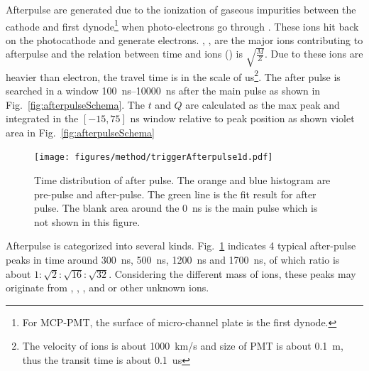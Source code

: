 Afterpulse are generated due to the ionization of gaseous impurities between the cathode and first dynode\footnote{For MCP-PMT, the surface of micro-channel plate is the first dynode.} when photo-electrons go through \cite{Coates_1973}. These ions hit back on the photocathode and generate electrons. , ,  are the major ions contributing to afterpulse and the relation between time and ions () is $\sqrt{\frac{M}{Z}}$\cite{Coates_1973}. Due to these ions are heavier than electron, the travel time is in the scale of \si{us}\footnote{The velocity of ions is about \SI{1000}{km/s} and size of PMT is about \SI{0.1}{m}, thus the transit time is about \SI{0.1}{us}}. The after pulse is searched in a window \SIrange{100}{10000}{ns} after the main pulse as shown in Fig.~\ref{fig:afterpulseSchema}. The $t$ and $Q$ are calculated as the max peak and integrated in the $[-15,75]$ ns window relative to peak position as shown violet area in Fig.~\ref{fig:afterpulseSchema}
\begin{figure}[!htbp]
    \centering
    \texttt{[image: figures/method/triggerAfterpulse1d.pdf]}
    \caption{Time distribution of after pulse. The orange and blue histogram are pre-pulse and after-pulse. The green line is the fit result for after pulse. The blank area around the \SI{0}{ns} is the main pulse which is not shown in this figure.}
    \label{fig:afterpulse1d}
\end{figure}

Afterpulse is categorized into several kinds. Fig.~\ref{fig:afterpulse1d} indicates 4 typical after-pulse peaks in time around \SI{300}{ns}, \SI{500}{ns}, \SI{1200}{ns} and \SI{1700}{ns}, of which ratio is about $1:\sqrt{2}:\sqrt{16}:\sqrt{32}$. Considering the different mass of ions, these peaks may originate from , , , and  or other unknown ions.

